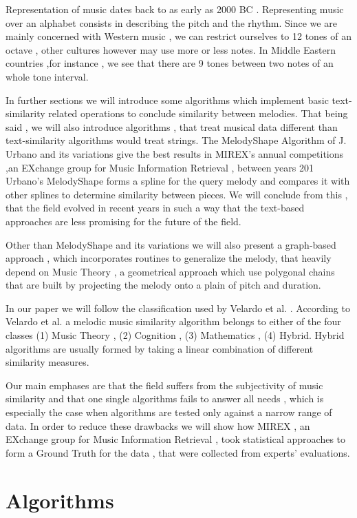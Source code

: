 \documentclass{llncs}
\begin{document}
		Representation of music dates back to as early as 2000 BC \cite{kil:civ}. Representing music over an alphabet consists in describing the pitch and the rhythm. Since we are mainly concerned with Western music , we can restrict ourselves to 12 tones of an octave , other cultures however may use more or less notes. In Middle Eastern countries ,for instance , we see that there are 9 tones between two notes of an whole tone interval.

		In further sections we will introduce some algorithms which implement basic text-similarity related operations to conclude similarity between melodies. That being said , we will also introduce  algorithms , that treat musical data different than text-similarity algorithms would treat  strings. The MelodyShape Algorithm of J. Urbano \cite{five_point_two}  and its variations give the best results in MIREX's annual competitions ,an EXchange group for Music Information Retrieval , between years 201
		Urbano's MelodyShape forms a spline for the query melody and compares it with other splines to determine similarity between pieces. We will conclude from this , that the field evolved in recent years in such a way that the text-based approaches are less promising for the future of the field.

		Other than MelodyShape and its variations we will also present a graph-based approach \cite{two_point_four} , which incorporates routines to generalize the melody, that heavily depend on Music Theory , a geometrical approach which use polygonal chains that are built by projecting the melody onto a plain of pitch and duration.

		In our paper we will follow the classification used by Velardo et al. \cite{two}. According to Velardo et al. a melodic music similarity algorithm belongs to either of the four classes (1) Music Theory , (2) Cognition , (3) Mathematics , (4) Hybrid. Hybrid algorithms are usually formed by taking a linear combination of different similarity measures. 

		Our main emphases are that the field suffers from the subjectivity of music similarity and that one single algorithms fails to answer all needs , which is especially the case when algorithms are tested only against a narrow range of data. In order to reduce these drawbacks we will show how MIREX , an EXchange group for Music Information Retrieval , took statistical approaches to form a Ground Truth for the data , that were collected from experts' evaluations. 
	
	\section{Algorithms}
\end{document}
